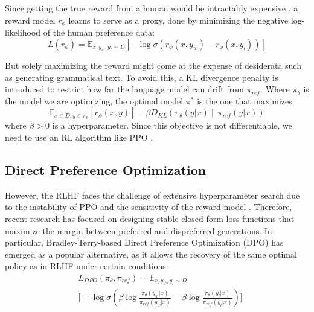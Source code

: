 Since getting the true reward from a human would be intractably expensive \cite{ethayarajh2024kto}, a reward model \( r_\phi \) learns to serve as a proxy, done by minimizing the negative log-likelihood of the human preference data:
\begin{equation}
    L(r_\phi) = \mathbb{E}_{x, y_w, y_l \sim D}[- \log \sigma(r_\phi(x, y_w) - r_\phi(x, y_l))]
\end{equation}


But solely maximizing the reward might come at the expense of desiderata such as generating grammatical text. To avoid this, a KL divergence penalty is introduced to restrict how far the language model can drift from \( \pi_{ref} \). Where \( \pi_\theta \) is the model we are optimizing, the optimal model \( \pi^* \) is the one that maximizes:
\begin{equation}
    \mathbb{E}_{x \in D, y \in \pi_\theta} [r_\phi(x, y)] - \beta D_{KL}(\pi_\theta(y|x) \parallel \pi_{ref}(y|x)) 
\end{equation}
where \( \beta > 0 \) is a hyperparameter. Since this objective is not differentiable, we need to use an RL algorithm like PPO \cite{schulman2017proximal}.



\subsection{Direct Preference Optimization}
However, the RLHF faces the challenge of extensive hyperparameter search due to the instability of PPO \cite{rafailov2024direct} and the sensitivity of the reward model \cite{gao2023scaling}.
Therefore, recent research has focused on designing stable closed-form loss functions that maximize the margin between preferred and dispreferred generations. 
In particular, Bradley-Terry-based Direct Preference Optimization (DPO) \cite{rafailov2024direct} has emerged as a popular alternative, as it allows the recovery of the same optimal policy as in RLHF under certain conditions:
\begin{equation}
\begin{aligned}
    & L_{DPO}(\pi_\theta, \pi_{ref}) = \mathbb{E}_{x, y_w, y_l \sim D} \\
    & \Big[  - \log \sigma \left( \beta \log \frac{\pi_\theta(y_w|x)}{\pi_{ref}(y_w|x)} - \beta \log \frac{\pi_\theta(y_l|x)}{\pi_{ref}(y_l|x)}  \right) \Big]
    \label{eq::bradly}
\end{aligned}
\end{equation}





